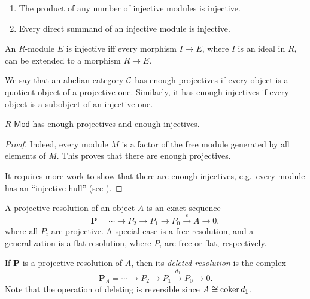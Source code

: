 \begin{prop}
    \begin{enumerate}
        \item The product of any number of injective modules is injective.
        \item Every direct summand of an injective module is injective.
    \end{enumerate}
\end{prop}

\begin{thm}
    An $R$-module $E$ is injective iff every morphism $I\to E$, where $I$ is an ideal in $R$, can be extended to a morphism $R\to E$.
\end{thm}


\begin{defn}
    We say that an abelian category $\mathcal{C}$ has enough projectives if every object is a quotient-object of a projective one. Similarly, it has enough injectives if every object is a subobject of an injective one.
\end{defn}

\begin{prop}
    $R\text{-}\mathsf{Mod}$ has enough projectives and enough injectives. 
\end{prop}
\begin{proof}
     Indeed, every module $M$ is a factor of the free module generated by all elements of $M$. This proves that there are enough projectives. 
     
     It requires more work to show that there are enough injectives, e.g.\ every module has an ``injective hull'' (see \cite[Thm. 3.38]{Rotman}).
\end{proof}

\begin{defn}
    A projective resolution of an object $A$ is an exact sequence
    \[\bm{P}=\cdots \to P_2\to P_1\to P_0\overset\epsilon\to A\to 0,\]
    where all $P_i$ are projective. A special case is a free resolution, and a generalization is a flat resolution, where $P_i$ are free or flat, respectively.
    
    If $\bm{P}$ is a projective resolution of $A$, then its \emph{deleted resolution} is the complex
    \[\bm{P}_A=\cdots\to P_2\to P_1\overset{d_1}\to P_0\to 0.\]
    Note that the operation of deleting is reversible since $A\cong \operatorname{coker} d_1$.
\end{defn}


